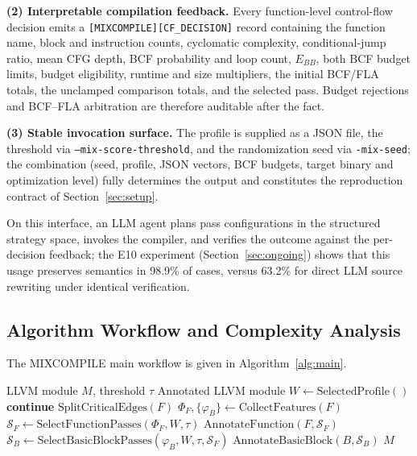 \documentclass[5p,times,authoryear]{elsarticle}
\theoremstyle{plain}
\theoremstyle{definition}
\theoremstyle{remark}
\begin{document}
\textbf{(2) Interpretable compilation feedback.} Every function-level control-flow
decision emits a \texttt{[MIXCOMPILE][CF\_DECISION]} record containing the function
name, block and instruction counts, cyclomatic complexity, conditional-jump ratio,
mean CFG depth, BCF probability and loop count, $E_{BB}$, both BCF budget limits,
budget eligibility, runtime and size multipliers, the initial BCF/FLA totals, the
unclamped comparison totals, and the selected pass. Budget rejections and BCF--FLA
arbitration are therefore auditable after the fact.

\textbf{(3) Stable invocation surface.} The profile is supplied as a JSON file, the
threshold via \texttt{--mix-score-threshold}, and the randomization seed via
\texttt{-mix-seed}; the combination (seed, profile, JSON vectors, BCF budgets, target
binary and optimization level) fully determines the output and constitutes the
reproduction contract of Section~\ref{sec:setup}.

On this interface, an LLM agent plans pass configurations in the structured
strategy space, invokes the compiler, and verifies the outcome against the
per-decision feedback; the E10 experiment (Section~\ref{sec:ongoing}) shows that
this usage preserves semantics in 98.9\% of cases, versus 63.2\% for direct LLM
source rewriting under identical verification.

\subsection{Algorithm Workflow and Complexity Analysis}

The MIXCOMPILE main workflow is given in Algorithm~\ref{alg:main}.

\begin{algorithm}[!t]
\footnotesize
\caption{MIXCOMPILE Main Workflow}
\label{alg:main}
\begin{algorithmic}[1]
    \Require LLVM module $M$, threshold $\tau$
    \Ensure Annotated LLVM module
    \State $W \gets \text{SelectedProfile}()$
         \State \textbf{continue} \EndIf
        \State $\text{SplitCriticalEdges}(F)$
        \State $\Phi_F, \{\varphi_B\} \gets \text{CollectFeatures}(F)$
        \State $\mathcal{S}_F \gets \text{SelectFunctionPasses}(\Phi_F, W, \tau)$
        \State $\text{AnnotateFunction}(F, \mathcal{S}_F)$
            \State $\mathcal{S}_B \gets \text{SelectBasicBlockPasses}(\varphi_B, W, \tau, \mathcal{S}_F)$
            \State $\text{AnnotateBasicBlock}(B, \mathcal{S}_B)$
        \EndFor
    \EndFor
    \Return $M$
\end{algorithmic}
\end{algorithm}
\end{document}
